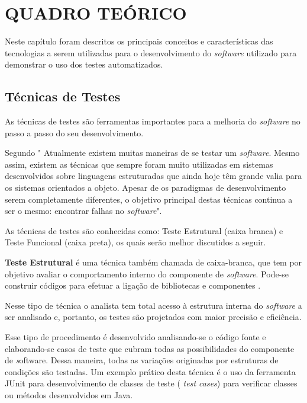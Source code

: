 \chapter{QUADRO TEÓRICO}

\par Neste capítulo foram descritos os principais conceitos e características das tecnologias a serem utilizadas para o desenvolvimento do \textit {software} utilizado para demonstrar o uso dos testes automatizados.

\section{Técnicas de Testes}

\par As técnicas de testes são ferramentas importantes para a melhoria do \textit{software} no passo a passo do seu desenvolvimento.
\begin{citacao}

 \par Segundo " Atualmente existem muitas maneiras de se testar um \textit {software}. Mesmo assim, existem as técnicas que sempre foram muito utilizadas em sistemas desenvolvidos sobre linguagens estruturadas que ainda hoje têm grande valia para os sistemas orientados a objeto. Apesar de os paradigmas de desenvolvimento serem completamente diferentes, o objetivo principal destas técnicas continua a ser o mesmo: encontrar falhas no \textit {software}".
 
\end{citacao}

\par As técnicas de testes são conhecidas como:  Teste Estrutural (caixa branca) e Teste Funcional (caixa preta), os quais serão melhor discutidos a seguir.

 \textbf{Teste Estrutural} é uma técnica também chamada de caixa-branca, que tem por objetivo avaliar o comportamento interno do componente de \textit{software}. Pode-se construir códigos para efetuar a ligação de bibliotecas e componentes \cite{tecnicas}.
 
 \par Nesse tipo de técnica o analista tem total acesso à estrutura interna do \textit{software} a ser analisado e, portanto, os testes são projetados com maior precisão e eficiência.
 
 \par Esse tipo de procedimento é desenvolvido analisando-se o código fonte e elaborando-se casos de teste que cubram todas as possibilidades do componente de \textit software. Dessa maneira, todas as variações originadas por estruturas de condições são testadas. Um exemplo prático desta técnica é o uso da ferramenta JUnit para desenvolvimento de classes de teste (\textit{ test cases}) para verificar classes ou métodos desenvolvidos em Java\cite{engenharia}.

